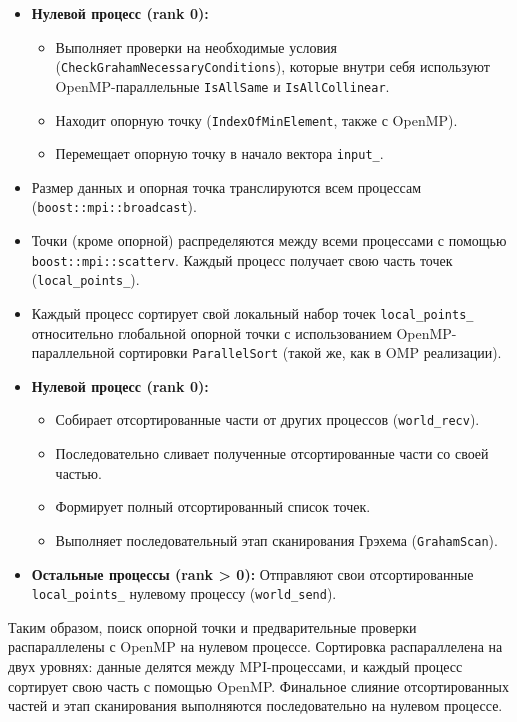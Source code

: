 \documentclass[12pt]{article}
\begin{document}
    \begin{itemize}
        \item \textbf{Нулевой процесс (rank 0):}
        \begin{itemize}
            \item Выполняет проверки на необходимые условия (\texttt{CheckGrahamNecessaryConditions}), которые внутри себя используют OpenMP-параллельные \texttt{IsAllSame} и \texttt{IsAllCollinear}.
            \item Находит опорную точку (\texttt{IndexOfMinElement}, также с OpenMP).
            \item Перемещает опорную точку в начало вектора \texttt{input\_}.
        \end{itemize}
            \item Размер данных и опорная точка транслируются всем процессам (\texttt{boost::mpi::broadcast}).
        \item Точки (кроме опорной) распределяются между всеми процессами с помощью \\\texttt{boost::mpi::scatterv}. Каждый процесс получает свою часть точек (\texttt{local\_points\_}).
        \item Каждый процесс сортирует свой локальный набор точек \texttt{local\_points\_} относительно глобальной опорной точки с использованием OpenMP-параллельной сортировки \texttt{ParallelSort} (такой же, как в OMP реализации).
        \item \textbf{Нулевой процесс (rank 0):}
        \begin{itemize}
        
        \item Собирает отсортированные части от других процессов (\texttt{world\_recv}).
            \item Последовательно сливает полученные отсортированные части со своей частью.
            \item Формирует полный отсортированный список точек.
            \item Выполняет последовательный этап сканирования Грэхема (\texttt{GrahamScan}).
        \end{itemize}
        
            \item \textbf{Остальные процессы (rank > 0):} Отправляют свои отсортированные \texttt{local\_points\_} нулевому процессу (\texttt{world\_send}).
    \end{itemize}

Таким образом, поиск опорной точки и предварительные проверки распараллелены с OpenMP на нулевом процессе. Сортировка распараллелена на двух уровнях: данные делятся между MPI-процессами, и каждый процесс сортирует свою часть с помощью OpenMP. Финальное слияние отсортированных частей и этап сканирования выполняются последовательно на нулевом процессе.
\end{document}
